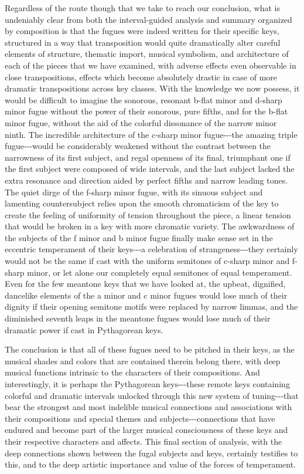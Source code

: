 Regardless of the route though that we take to reach our conclusion,
what is undeniably clear from both the interval-guided analysis and
summary organized by composition is that the fugues were indeed written
for their specific keys, structured in a way that transposition would
quite dramatically alter careful elements of structure, thematic import,
musical symbolism, and architecture of each of the pieces that we have
examined, with adverse effects even observable in close transpositions,
effects which become absolutely drastic in case of more dramatic
transpositions across key classes. With the knowledge we now possess, it
would be difficult to imagine the sonorous, resonant b-flat minor and
d-sharp minor fugue without the power of their sonorous, pure fifths,
and for the b-flat minor fugue, without the aid of the colorful
dissonance of the narrow minor ninth. The incredible architecture of the
c-sharp minor fugue-\/-\/-the amazing triple fugue-\/-\/-would be
considerably weakened without the contrast between the narrowness of its
first subject, and regal openness of its final, triumphant one if the
first subject were composed of wide intervals, and the last subject
lacked the extra resonance and direction aided by perfect fifths and
narrow leading tones. The quiet dirge of the f-sharp minor fugue, with
its sinuous subject and lamenting countersubject relies upon the smooth
chromaticism of the key to create the feeling of uniformity of tension
throughout the piece, a linear tension that would be broken in a key
with more chromatic variety. The awkwardness of the subjects of the f
minor and b minor fugue finally make sense set in the eccentric
temperament of their keys-\/-\/-a celebration of strangeness-\/-\/-they
certainly would not be the same if cast with the uniform semitones of
c-sharp minor and f-sharp minor, or let alone our completely equal
semitones of equal temperament. Even for the few meantone keys that we
have looked at, the upbeat, dignified, dancelike elements of the a minor
and c minor fugues would lose much of their dignity if their opening
semitone motifs were replaced by narrow limmas, and the diminished
seventh leaps in the meantone fugues would lose much of their dramatic
power if cast in Pythagorean keys.

The conclusion is that all of these fugues need to be pitched in their
keys, as the musical shades and colors that are contained therein belong
there, with deep musical functions intrinsic to the characters of their
compositions. And interestingly, it is perhaps the Pythagorean
keys-\/-\/-these remote keys containing colorful and dramatic intervals
unlocked through this new system of tuning-\/-\/-that bear the strongest
and most indelible musical connections and associations with their
compositions and special themes and subjects-\/-\/-connections that have
endured and become part of the larger musical consciousness of these
keys and their respective characters and affects. This final section of
analysis, with the deep connections shown between the fugal subjects and
keys, certainly testifies to this, and to the deep artistic importance
and value of the forces of temperament.


    
    
    

